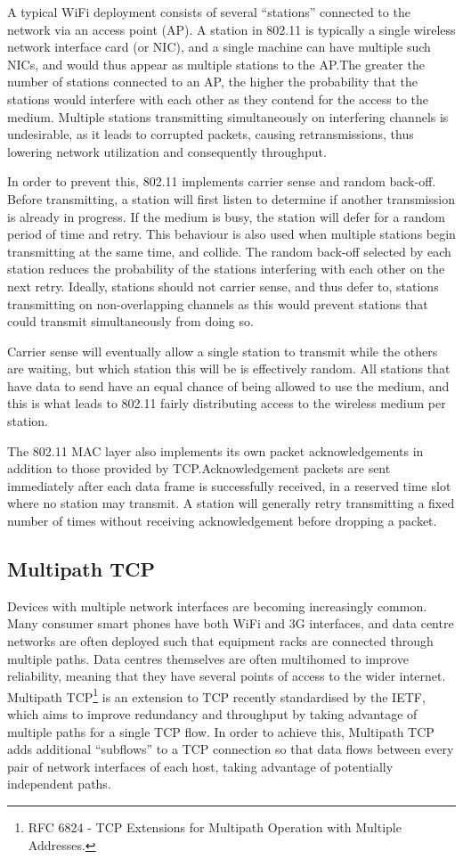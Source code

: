 A typical WiFi deployment consists of several ``stations'' connected to
the network via an access point (AP). A station in 802.11 is typically a single
wireless network interface card (or NIC), and a single machine can have multiple
such NICs, and would thus appear as multiple stations to the AP.\@ The greater
the number of stations connected to an AP, the higher the probability that the
stations would interfere with each other as they contend for the access to the
medium. Multiple stations transmitting simultaneously
on interfering channels is undesirable, as it leads to corrupted packets,
causing retransmissions, thus lowering network utilization and
consequently throughput.

In order to prevent this, 802.11 implements carrier sense and random back-off. Before
transmitting, a station will first listen to determine if another transmission is already
in progress. If the medium is busy, the station will defer for a
random period of time and retry. This behaviour is also used when multiple
stations begin transmitting at the same time, and collide. The random back-off
selected by each station reduces the probability of the stations interfering
with each other on the next retry. Ideally, stations should not carrier sense,
and thus defer to, stations transmitting on non-overlapping channels as this would prevent stations
that could transmit simultaneously from doing so.

Carrier sense will eventually allow a single station to transmit while the
others are waiting, but which station this will be is effectively random. All
stations that have data to send have an equal chance of being allowed to use the
medium, and this is what leads to 802.11 fairly distributing access to the
wireless medium per station.

The 802.11 MAC layer also implements its own packet acknowledgements in addition
to those provided by TCP.\@ Acknowledgement packets are sent immediately after
each data frame is successfully received, in a reserved time slot where no station
may transmit. A station will generally retry transmitting a fixed number of times
without receiving acknowledgement before dropping a packet.

\subsection{Multipath TCP}
\label{sec:bg:mptcp}
Devices with multiple network interfaces are becoming increasingly common. Many consumer
smart phones have both WiFi and 3G interfaces, and data centre networks are
often deployed such that equipment racks are connected through multiple paths.
Data centres themselves are often multihomed to improve reliability, meaning
that they have several points of access to the wider internet. Multipath
TCP\footnote{RFC 6824 - TCP Extensions for Multipath Operation with Multiple
Addresses.} is an extension to TCP recently standardised by the IETF, which aims
to improve redundancy and throughput by taking advantage of multiple paths for a
single TCP flow. In order to achieve this, Multipath TCP adds additional
``subflows'' to a TCP connection so that data flows between every pair of
network interfaces of each host, taking advantage of potentially independent
paths.

